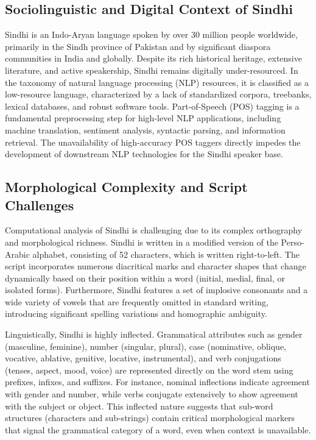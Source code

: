 \documentclass[12pt,a4paper]{article}
\begin{document}
\subsection{Sociolinguistic and Digital Context of Sindhi}
Sindhi is an Indo-Aryan language spoken by over 30 million people worldwide, primarily in the Sindh province of Pakistan and by significant diaspora communities in India and globally. Despite its rich historical heritage, extensive literature, and active speakership, Sindhi remains digitally under-resourced. In the taxonomy of natural language processing (NLP) resources, it is classified as a low-resource language, characterized by a lack of standardized corpora, treebanks, lexical databases, and robust software tools. Part-of-Speech (POS) tagging is a fundamental preprocessing step for high-level NLP applications, including machine translation, sentiment analysis, syntactic parsing, and information retrieval. The unavailability of high-accuracy POS taggers directly impedes the development of downstream NLP technologies for the Sindhi speaker base.

\subsection{Morphological Complexity and Script Challenges}
Computational analysis of Sindhi is challenging due to its complex orthography and morphological richness. Sindhi is written in a modified version of the Perso-Arabic alphabet, consisting of 52 characters, which is written right-to-left. The script incorporates numerous diacritical marks and character shapes that change dynamically based on their position within a word (initial, medial, final, or isolated forms). Furthermore, Sindhi features a set of implosive consonants and a wide variety of vowels that are frequently omitted in standard writing, introducing significant spelling variations and homographic ambiguity.

Linguistically, Sindhi is highly inflected. Grammatical attributes such as gender (masculine, feminine), number (singular, plural), case (nominative, oblique, vocative, ablative, genitive, locative, instrumental), and verb conjugations (tenses, aspect, mood, voice) are represented directly on the word stem using prefixes, infixes, and suffixes. For instance, nominal inflections indicate agreement with gender and number, while verbs conjugate extensively to show agreement with the subject or object. This inflected nature suggests that sub-word structures (characters and sub-strings) contain critical morphological markers that signal the grammatical category of a word, even when context is unavailable.
\end{document}
